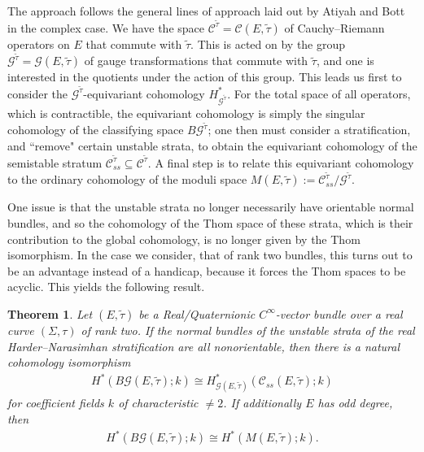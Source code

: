 \documentclass[10pt,a4paper]{amsart}
\numberwithin{equation}{section}
\newtheorem{Theorem}{Theorem}[section]
\begin{document}
The approach follows the general lines of approach laid out by Atiyah and Bott \cite{AB} in the complex case. We have the space ${\mathcal C}^{\tilde{\tau}} = {\mathcal C}(E,\tilde{\tau})$ of Cauchy--Riemann operators on $E$ that commute with $\tilde{\tau}$. This is acted on by the group ${\mathcal G}^{\tilde{\tau}} = {\mathcal G}(E,\tilde{\tau})$ of gauge transformations that commute with $\tilde{\tau}$, and one is interested in the quotients under the action of this group. This leads us f\/irst to consider the ${\mathcal G}^{\tilde{\tau}}$-equivariant cohomology $H^*_{{\mathcal G}^{\tilde{\tau}}}$. For the total space of all operators, which is contractible, the equivariant cohomology is simply the singular cohomology of the classifying space $B{\mathcal G}^{\tilde{\tau}}$; one then must consider a stratif\/ication, and ``remove" certain unstable strata, to obtain the equivariant cohomology of the semistable stratum ${\mathcal C}_{ss}^{\tilde{\tau}} \subseteq {\mathcal C}^{\tilde{\tau}}$. A f\/inal step is to relate this equivariant cohomology to the ordinary cohomology of the moduli space $M(E,\tilde{\tau}) := {\mathcal C}_{ss}^{\tilde{\tau}}/ {\mathcal G}^{\tilde{\tau}}$.

One issue is that the unstable strata no longer necessarily have orientable normal bundles, and so the cohomology of the Thom space of these strata, which is their contribution to the global cohomology, is no longer given by the Thom isomorphism. In the case we consider, that of rank two bundles, this turns out to be an advantage instead of a handicap, because it forces the Thom spaces to be acyclic. This yields the following result.

\begin{Theorem}\label{isomcoh}
	Let $(E,\tilde{\tau})$ be a Real/Quaternionic $C^{\infty}$-vector bundle over a real curve $(\Sigma,\tau)$ of rank two. If the normal bundles of the unstable strata of the real Harder--Narasimhan stratification are all nonorientable, then there is a natural cohomology isomorphism
\begin{gather*}%
 H^*(B{\mathcal G}(E,\tilde{\tau}); k) \cong H_{{\mathcal G}(E,\tilde{\tau})}^*({\mathcal C}_{ss}(E,\tilde{\tau}); k)
\end{gather*}
for coefficient fields $k$ of characteristic $\neq 2$. If additionally $E$ has odd degree, then
\begin{gather*}%
H^*(B{\mathcal G}(E,\tilde{\tau}); k) \cong H^*(M(E,\tilde{\tau}); k).
\end{gather*}
\end{Theorem}
\end{document}
